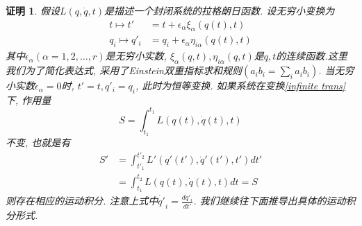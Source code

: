 \documentclass[a4paper,11pt]{article}
\theoremstyle{mystyle}
\newtheorem{Proof}{\hspace{2em}证明}[section]
\begin{document}
\begin{Proof}
  假设$L(q,\dot{q},t)$是描述一个封闭系统的拉格朗日函数. 设无穷小变换为
  \begin{equation}\label{infinite trans}
  \begin{split}
     t\mapsto t'&=t+\epsilon_\alpha\xi_\alpha(q(t),t) \\
       q_i\mapsto q'_i&=q_i+\epsilon_\alpha\eta_{i\alpha}(q(t),t)
  \end{split}
  \end{equation}
  其中$\epsilon_\alpha(\alpha=1,2,\dots,r)$是无穷小实数, $\xi_\alpha(q,t),\eta_{i\alpha}(q,t)$是$q,t$的连续函数.这里我们为了简化表达式, 采用了Einstein双重指标求和规则$(a_i b_i=\sum_{i}a_i b_i)$. 当无穷小实数$\epsilon_\alpha=0$时, $t'=t,q'_i=q_i$, 此时为恒等变换. 如果系统在变换\eqref{infinite trans}下, 作用量
  \begin{equation}\label{action inv inf}
    S=\int_{t_1}^{t_1}L(q(t),\dot{q}(t),t)
  \end{equation}
  不变, 也就是有
  \begin{equation*}
  \begin{split}
     S'&=\int_{t'_1}^{t'_2}L'(q'(t'),\dot{q}'(t'),t')dt' \\
       &=\int_{t_1}^{t_2}L(q(t),\dot{q}(t),t)dt=S
  \end{split}
  \end{equation*}
  则存在相应的运动积分. 注意上式中$\dot{q'}_i=\frac{d{q'_i}}{dt'}$. 我们继续往下面推导出具体的运动积分形式.


\end{Proof}
\end{document}
